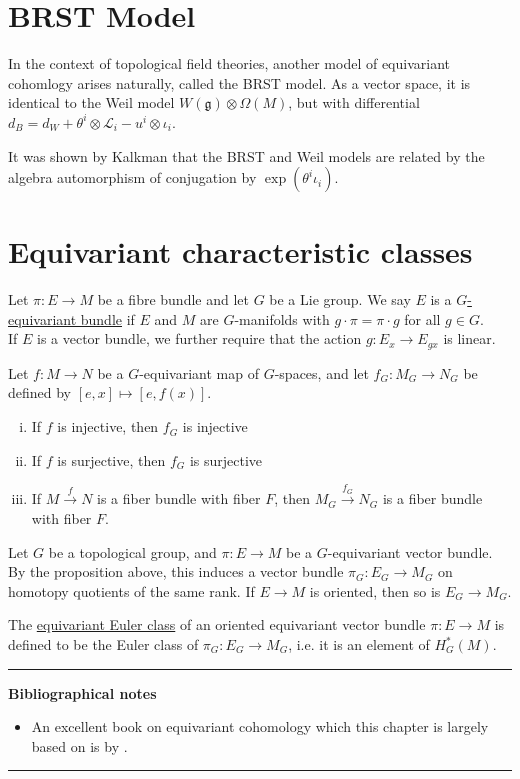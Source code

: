 \section{BRST Model}
In the context of topological field theories, another model of equivariant
cohomlogy arises naturally, called the BRST model. As a vector space, it is
identical to the Weil model $W(\mathfrak{g})\otimes \Omega(M)$, but with
differential $d_B = d_W + \theta^i\otimes \mathcal{L}_i - u^i \otimes \iota_i$.

It was shown by Kalkman that the BRST and Weil models are related by the algebra
automorphism of conjugation by $\exp (\theta^i \iota_i)$. 


\section{Equivariant characteristic classes}
\begin{defn} %
	Let $\pi: E\to M$ be a fibre bundle and let $G$ be a Lie group. We say $E$
	is a \underline{$G$-equivariant bundle} if $E$ and  $M$ are 
	$G$-manifolds  with $g \cdot \pi = \pi \cdot g$ for all  $g\in G$.\\
	If  $E$ is a vector bundle, we further require that the action  $g: E_x \to
	E_{gx}$ is linear.
\end{defn}

\begin{prop} %
	Let $f:M\to N$ be a $G$-equivariant map of  $G$-spaces, and let
	$f_G:M_G\to N_G$ be defined by $[e,x]\mapsto [e,f(x)]$. 
	\begin{enumerate}[(i)]
	    \item If $f$ is injective, then $f_G$ is injective
		\item If $f$ is surjective, then $f_G$ is surjective
		\item If $M\xrightarrow{f} N$ is a fiber bundle with fiber $F$, then
			$M_G\xrightarrow{f_G}N_G$ is a fiber bundle with fiber  $F$. 	
	\end{enumerate}
\end{prop}

Let $G$ be a topological group, and  $\pi : E\to M$ be a  $G$-equivariant vector
bundle. By the proposition above, this induces a vector bundle  $\pi_G : E_G\to
M_G$ on homotopy quotients of the same rank. If $E\to M$ is oriented, then so is
$E_G \to M_G$. 

The \underline{equivariant Euler class} of an oriented equivariant vector bundle
$\pi : E \to M$ is defined to be the Euler class of $\pi_G : E_G \to M_G$, i.e.
it is an element of $H_G^*(M)$. 

\vspace{5mm}
\hrule 
\vspace{5mm}

\textbf{Bibliographical notes}
{\small
\begin{itemize}
	\item An excellent book on equivariant cohomology which this chapter is
	largely based on is  by
	\citet{equivariant_tu}.
\end{itemize}
}

\hrule
